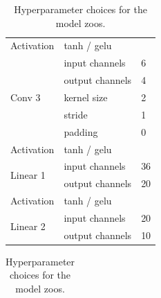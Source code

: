 \begin{table}[ht!]
\begin{minipage}{0.4\textwidth}
{\begin{tabularx}{\linewidth}{lll}
        \cmidrule(r){1-1} \cmidrule(rl){2-2}  \cmidrule(rl){3-3}%
        Activation              & tanh / gelu         &                      \\
        \cmidrule(r){1-1} \cmidrule(rl){2-2}  \cmidrule(rl){3-3}%
        \multirow{5}{*}{Conv 3} & input channels     & 6                    \\
                                & output channels    & 4                    \\
                                & kernel size        & 2                    \\
                                & stride             & 1                    \\
                                & padding            & 0                    \\
        \cmidrule(r){1-1} \cmidrule(rl){2-2}  \cmidrule(rl){3-3}%
        Activation              & tanh / gelu         &                      \\
        \cmidrule(r){1-1} \cmidrule(rl){2-2}  \cmidrule(rl){3-3}%
        \multirow{2}{*}{Linear 1} & input channels     & 36                   \\
                                & output channels    & 20                   \\
        \cmidrule(r){1-1} \cmidrule(rl){2-2}  \cmidrule(rl){3-3}%
        Activation              & tanh / gelu         &                      \\
        \cmidrule(r){1-1} \cmidrule(rl){2-2}  \cmidrule(rl){3-3}%
        \multirow{2}{*}{Linear 2} & input channels     & 20                   \\
                                & output channels    & 10                   \\
        \bottomrule
    \end{tabularx}
    \label{tab:model_zoo_architecture}
    }
    \end{minipage}
    \hspace{2mm}
    \begin{minipage}{0.58\textwidth}
    \centering
    {\small
    \caption{Hyperparameter choices for the model zoos. }
    \begin{tabularx}{\linewidth}{lll}

\end{tabularx}}
\end{minipage}
\end{table}

